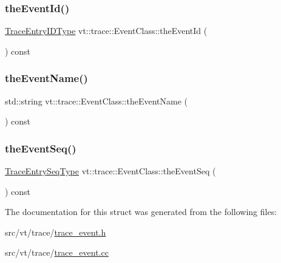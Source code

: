 \subsubsection{\texorpdfstring{the\+Event\+Id()}{theEventId()}}
{\footnotesize\ttfamily \hyperlink{namespacevt_1_1trace_a3c14050715ba9eceaeff51fb3de64f2f}{Trace\+Entry\+I\+D\+Type} vt\+::trace\+::\+Event\+Class\+::the\+Event\+Id (\begin{DoxyParamCaption}{ }\end{DoxyParamCaption}) const}

\mbox{\label{structvt_1_1trace_1_1_event_class_a471707cbfb7257528c3fa18bbaad485b}} 
\subsubsection{\texorpdfstring{the\+Event\+Name()}{theEventName()}}
{\footnotesize\ttfamily std\+::string vt\+::trace\+::\+Event\+Class\+::the\+Event\+Name (\begin{DoxyParamCaption}{ }\end{DoxyParamCaption}) const}

\mbox{\label{structvt_1_1trace_1_1_event_class_a1bcdfd92ebe57e35dc740550c33fa831}} 
\subsubsection{\texorpdfstring{the\+Event\+Seq()}{theEventSeq()}}
{\footnotesize\ttfamily \hyperlink{namespacevt_1_1trace_a522028dd2a7d056f0ec3d417836fdecd}{Trace\+Entry\+Seq\+Type} vt\+::trace\+::\+Event\+Class\+::the\+Event\+Seq (\begin{DoxyParamCaption}{ }\end{DoxyParamCaption}) const}



The documentation for this struct was generated from the following files\+:\begin{DoxyCompactItemize}
\item 
src/vt/trace/\hyperlink{trace__event_8h}{trace\+\_\+event.\+h}\item 
src/vt/trace/\hyperlink{trace__event_8cc}{trace\+\_\+event.\+cc}\end{DoxyCompactItemize}
